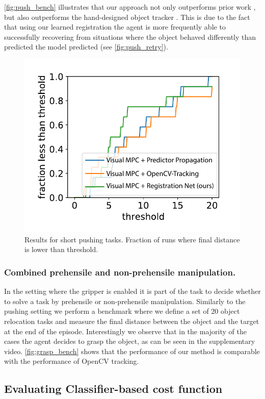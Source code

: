 \autoref{fig:push_bench} illustrates that our approach not only outperforms prior work \cite{sna}, but also outperforms the hand-designed object tracker \cite{babenko2009visual}. This is due to the fact that using our learned registration the agent is more frequently able to successfully recovering from situations where the object behaved differently than predicted the model predicted (see \autoref{fig:push_retry}).

\begin{figure}
	\centering
	\includegraphics[width=0.6\columnwidth]{images_rfr/pushshort_bench_plots.pdf}
	\caption{\small{Results for short pushing tasks.  Fraction of runs where final distance is lower than threshold.}}
	\label{fig:push_bench_short}
\end{figure}

\subsubsection{Combined prehensile and non-prehensile manipulation.}


In the setting where the gripper is enabled it is part of the task to decide whether to solve a task by prehensile or non-prehensile manipulation. Similarly to the pushing setting we perform a benchmark where we define a set of 20 object relocation tasks and measure the final distance between the object and the target at the end of the episode. Interestingly we observe that in the majority of the cases the agent decides to grasp the object, as can be seen in the supplementary video. \autoref{fig:grasp_bench} shows that the performance of our method is comparable with the performance of OpenCV tracking.




\subsection{Evaluating Classifier-based cost function}

